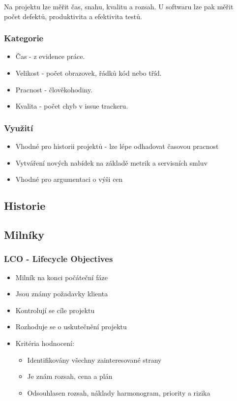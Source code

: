       Na projektu lze měřit čas, snahu, kvalitu a rozsah. U softwaru lze pak měřit počet defektů, produktivita a efektivita testů.

      \subsubsection{Kategorie}
        \begin{itemize}
          \item Čas - z evidence práce.
          \item Velikost - počet obrazovek, řádků kód nebo tříd.
          \item Pracnost - člověkohodiny.
          \item Kvalita - počet chyb v issue trackeru.
        \end{itemize}

      \subsubsection{Využití}
          \begin{itemize}
            \item Vhodné pro historii projektů - lze lépe odhadovat časovou pracnost
            \item Vytváření nových nabídek na základě metrik a servisních smluv
            \item Vhodné pro argumentaci o výši cen
          \end{itemize}

    \subsection{Historie}

    \subsection{Milníky}
      \subsubsection{LCO - Lifecycle Objectives}
        \begin{itemize}
          \item Milník na konci počáteční fáze
          \item Jsou známy požadavky klienta
          \item Kontrolují se cíle projektu
          \item Rozhoduje se o uskutečnění projektu
          \item Kritéria hodnocení:
            \begin{itemize}
              \item Identifikovány všechny zainteresované strany
              \item Je znám rozsah, cena a plán
              \item Odsouhlasen rozsah, náklady harmonogram, priority a rizika
            \end{itemize}
        \end{itemize}

